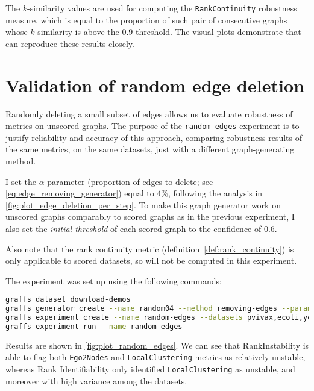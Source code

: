 The $k$-similarity values are used for computing the \texttt{RankContinuity} robustness measure, which is equal to the proportion of such pair of consecutive graphs whose $k$-similarity is above the $0.9$ threshold.
The visual plots demonstrate that \graffs can reproduce these results closely.


\section{Validation of random edge deletion}



Randomly deleting a small subset of edges allows us to evaluate robustness of metrics on unscored graphs.
The purpose of the \texttt{random-edges} experiment is to justify reliability and accuracy of this approach, comparing robustness results of the same metrics, on the same datasets, just with a different graph-generating method.

I set the $\alpha$ parameter (proportion of edges to delete; see \autoref{eq:edge_removing_generator}) equal to $4\%$, following the analysis in \autoref{fig:plot_edge_deletion_per_step}.
To make this graph generator work on unscored graphs comparably to scored graphs as in the previous experiment, I also set the \textsl{initial threshold} of each scored graph to the confidence of $0.6$.

Also note that the rank continuity metric (definition~\ref{def:rank_continuity}) is only applicable to scored datasets, so will not be computed in this experiment.

The experiment was set up using the following commands:
\begin{lstlisting}[language=bash]
graffs dataset download-demos
graffs generator create --name random04 --method removing-edges --params 0.04,600 -n 31 --seed 7
graffs experiment create --name random-edges --datasets pvivax,ecoli,yeast --generator random04 --metrics Betweenness,Degree,Ego1Edges,Ego2Nodes,LocalClustering,PageRank,Redundancy --robustnessMeasures RankIdentifiability,RankInstability
graffs experiment run --name random-edges
\end{lstlisting}



Results are shown in \autoref{fig:plot_random_edges}.
We can see that RankInstability is able to flag both \texttt{Ego2Nodes} and \texttt{LocalClustering} metrics as relatively unstable, whereas Rank Identifiability only identified \texttt{LocalClustering} as unstable, and moreover with high variance among the datasets.


